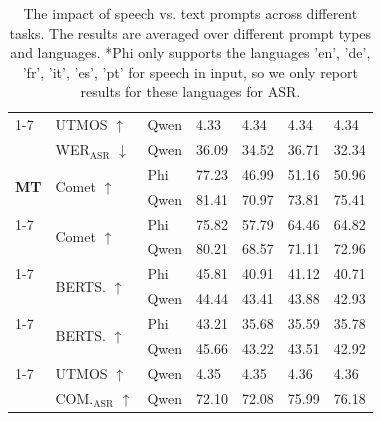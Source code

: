 \begin{table}[]
\begin{tabular}{p{0.6cm}p{1.3cm}p{0.6cm}p{0.7cm}p{0.7cm}p{0.7cm}p{0.7cm}}
     \cmidrule(lr){1-7}
     \multirow{2}{*}{\textbf{TTS}} & UTMOS $\uparrow$ & Qwen & \cellcolor{taskblue!20} 4.33 & \cellcolor{taskblue!80} 4.34 & \cellcolor{taskpink!20} 4.34 & \cellcolor{taskpink!80} 4.34 \\
      & WER$_{\text{ASR}}$ $\downarrow$ & Qwen & \cellcolor{taskblue!20} 36.09 & \cellcolor{taskblue!80} 34.52 & \cellcolor{taskpink!20} 36.71 & \cellcolor{taskpink!80} 32.34 \\
     \midrule
     \multirow{2}{*}{\textbf{MT}} & \multirow{2}{*}{Comet $\uparrow$} & Phi & \cellcolor{taskgreen!73} 77.23 & \cellcolor{taskgreen!20} 46.99 & \cellcolor{taskorange!20} 51.16 & \cellcolor{taskorange!20} 50.96 \\
      &  & Qwen & \cellcolor{taskgreen!80} 81.41 & \cellcolor{taskgreen!62} 70.97 & \cellcolor{taskorange!76} 73.81 & \cellcolor{taskorange!80} 75.41 \\
     \cmidrule(lr){1-7}
     \multirow{2}{*}{\textbf{ST}} & \multirow{2}{*}{Comet $\uparrow$} & Phi & \cellcolor{taskblue!68} 75.82 & \cellcolor{taskblue!20} 57.79 & \cellcolor{taskpink!20} 64.46 & \cellcolor{taskpink!23} 64.82 \\
      &  & Qwen & \cellcolor{taskblue!80} 80.21 & \cellcolor{taskblue!49} 68.57 & \cellcolor{taskpink!67} 71.11 & \cellcolor{taskpink!80} 72.96 \\
     \cmidrule(lr){1-7}
     \multirow{2}{*}{\textbf{TSUM}} & \multirow{2}{*}{BERTS. $\uparrow$} & Phi & \cellcolor{taskgreen!80} 45.81 & \cellcolor{taskgreen!20} 40.91 & \cellcolor{taskorange!28} 41.12 & \cellcolor{taskorange!20} 40.71 \\
      &  & Qwen & \cellcolor{taskgreen!63} 44.44 & \cellcolor{taskgreen!51} 43.41 & \cellcolor{taskorange!80} 43.88 & \cellcolor{taskorange!62} 42.93 \\
     \cmidrule(lr){1-7}
     \multirow{2}{*}{\textbf{SSUM}} & \multirow{2}{*}{BERTS. $\uparrow$} & Phi & \cellcolor{taskblue!65} 43.21 & \cellcolor{taskblue!20} 35.68 & \cellcolor{taskpink!20} 35.59 & \cellcolor{taskpink!21} 35.78 \\
      &  & Qwen & \cellcolor{taskblue!80} 45.66 & \cellcolor{taskblue!65} 43.22 & \cellcolor{taskpink!80} 43.51 & \cellcolor{taskpink!76} 42.92 \\
     \cmidrule(lr){1-7}
     \multirow{2}{*}{\textbf{S2ST}} & UTMOS $\uparrow$ & Qwen & \cellcolor{taskgreen!20} 4.35 & \cellcolor{taskgreen!80} 4.35 & \cellcolor{taskorange!20} 4.36 & \cellcolor{taskorange!80} 4.36 \\
      & COM.$_{\text{ASR}}$ $\uparrow$ & Qwen & \cellcolor{taskgreen!80} 72.10 & \cellcolor{taskgreen!20} 72.08 & \cellcolor{taskorange!20} 75.99 & \cellcolor{taskorange!80} 76.18 \\
     \bottomrule
    \end{tabular}
    \caption{The impact of speech vs. text prompts across different tasks. The results are averaged over different prompt types and languages. *Phi only supports the languages 'en', 'de', 'fr', 'it', 'es', 'pt' for speech in input, so we only report results for these languages for ASR.}
    \label{tab:modality}
\end{table}